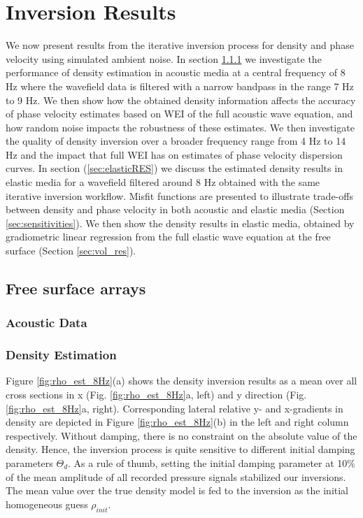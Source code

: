 \documentclass[]{article}
\begin{document}
	\section{Inversion Results}
	We now present results from the iterative inversion process for density and phase velocity using simulated ambient noise. In section \ref{sec:rho_est} we investigate the performance of density estimation in acoustic media at a central frequency of 8 Hz where the wavefield data is filtered with a narrow bandpass in the range 7 Hz to 9 Hz. We then show how the obtained density information affects the accuracy of phase velocity estimates based on WEI of the full acoustic wave equation, and how random noise impacts the robustness of these estimates. We then investigate the quality of density inversion over a broader frequency range from 4 Hz to 14 Hz and the impact that full WEI has on estimates of phase velocity dispersion curves. In section (\ref{sec:elasticRES}) we discuss the estimated density results in elastic media for a wavefield filtered around 8 Hz obtained with the same iterative inversion workflow. Misfit functions are presented to illustrate trade-offs between density and phase velocity in both acoustic and elastic media (Section \ref{sec:sensitivities}). We then show the density results in elastic media, obtained by gradiometric linear regression from the full elastic wave equation at the free surface (Section \ref{sec:vol_res}).
	
	\subsection{Free surface arrays}
	\subsubsection{Acoustic Data} \label{sec:rho_est}
	\subsubsection*{Density Estimation} 
	
	Figure \ref{fig:rho_est_8Hz}(a) shows the density inversion results as a mean over all cross sections in x (Fig. \ref{fig:rho_est_8Hz}a, left) and y direction (Fig. \ref{fig:rho_est_8Hz}a, right). Corresponding lateral relative y- and x-gradients in density are depicted in Figure \ref{fig:rho_est_8Hz}(b) in the left and right column respectively. Without damping, there is no constraint on the absolute value of the density.  Hence, the inversion process is quite sensitive to different initial damping parameters $\Theta_{d}$. As a rule of thumb, setting the initial damping parameter at 10$\%$ of the mean amplitude of all recorded pressure signals stabilized our inversions. The mean value over the true density model is fed to the inversion as the initial homogeneous guess $\rho_{init}$. \\
	
\end{document}
